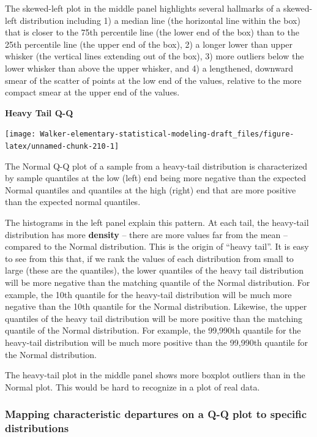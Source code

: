 \documentclass[]{book}
\begin{document}
The skewed-left plot in the middle panel highlights several hallmarks of a skewed-left distribution including 1) a median line (the horizontal line within the box) that is closer to the 75th percentile line (the lower end of the box) than to the 25th percentile line (the upper end of the box), 2) a longer lower than upper whisker (the vertical lines extending out of the box), 3) more outliers below the lower whisker than above the upper whisker, and 4) a lengthened, downward smear of the scatter of points at the low end of the values, relative to the more compact smear at the upper end of the values.

\textbf{Heavy Tail Q-Q}

\texttt{[image: Walker-elementary-statistical-modeling-draft\_files/figure-latex/unnamed-chunk-210-1]}

The Normal Q-Q plot of a sample from a heavy-tail distribution is characterized by sample quantiles at the low (left) end being more negative than the expected Normal quantiles and quantiles at the high (right) end that are more positive than the expected normal quantiles.

The histograms in the left panel explain this pattern. At each tail, the heavy-tail distribution has more \textbf{density} -- there are more values far from the mean -- compared to the Normal distribution. This is the origin of ``heavy tail''. It is easy to see from this that, if we rank the values of each distribution from small to large (these are the quantiles), the lower quantiles of the heavy tail distribution will be more negative than the matching quantile of the Normal distribution. For example, the 10th quantile for the heavy-tail distribution will be much more negative than the 10th quantile for the Normal distribution. Likewise, the upper quantiles of the heavy tail distribution will be more positive than the matching quantile of the Normal distribution. For example, the 99,990th quantile for the heavy-tail distribution will be much more positive than the 99,990th quantile for the Normal distribution.

The heavy-tail plot in the middle panel shows more boxplot outliers than in the Normal plot. This would be hard to recognize in a plot of real data.

\hypertarget{mapping-characteristic-departures-on-a-q-q-plot-to-specific-distributions}{%
\subsubsection{Mapping characteristic departures on a Q-Q plot to specific distributions}\label{mapping-characteristic-departures-on-a-q-q-plot-to-specific-distributions}}
\end{document}

